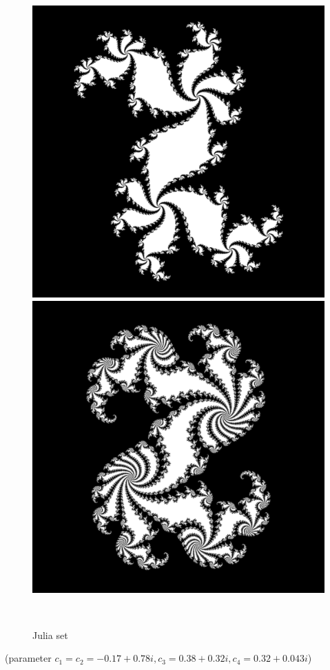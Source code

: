 \documentclass[12pt]{article}
\theoremstyle{plain}
\begin{document}
\begin{figure}[H]
\begin{minipage}[c][0.24\width]{
   0.24\textwidth}
   \includegraphics[width=.8\textwidth]{figure/section4/Julia-3.png}
\end{minipage}
\begin{minipage}[c][0.24\width]{
   0.24\textwidth}
   \centering
   \includegraphics[width=.8\textwidth]{figure/section4/Julia-4.png}
\end{minipage}
\\[5ex]\caption{Julia set}\label{sample-julia-set}
\end{figure}
(parameter $c_1 = c_2 = -0.17 + 0.78i, c_3 = 0.38 + 0.32i, c_4 = 0.32+0.043i$)
\end{document}
